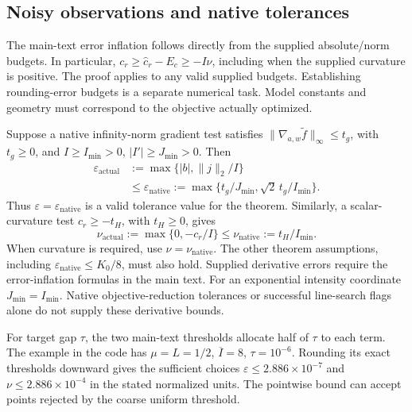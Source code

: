 \documentclass[10pt,a4paper]{article}
\begin{document}
\subsection{Noisy observations and native tolerances}
The main-text error inflation follows directly from the supplied absolute/norm budgets. In particular, $c_r\ge\widehat c_r-E_c\ge-I\nu$, including when the supplied curvature is positive. The proof applies to any valid supplied budgets. Establishing rounding-error budgets is a separate numerical task. Model constants and geometry must correspond to the objective actually optimized.

Suppose a native infinity-norm gradient test satisfies $\|\nabla_{a,w}\widetilde f\|_\infty\le t_g$, with $t_g\ge0$, and $I\ge I_{\min}>0$, $|I'|\ge J_{\min}>0$. Then
\begin{equation}
 \begin{aligned}
 \varepsilon_{\mathrm{actual}}&:=\max\{|b|,\|j\|_2/I\}\\
 &\le\varepsilon_{\mathrm{native}}
 :=\max\{t_g/J_{\min},\sqrt2\,t_g/I_{\min}\}.
 \end{aligned}
 \label{eq:sstoprawconversion}
\end{equation}
Thus $\varepsilon=\varepsilon_{\mathrm{native}}$ is a valid tolerance value for the theorem. Similarly, a scalar-curvature test $c_r\ge-t_H$, with $t_H\ge0$, gives
\begin{equation*}
 \nu_{\mathrm{actual}}:=\max\{0,-c_r/I\}
 \le\nu_{\mathrm{native}}:=t_H/I_{\min}.
\end{equation*}
When curvature is required, use $\nu=\nu_{\mathrm{native}}$. The other theorem assumptions, including $\varepsilon_{\mathrm{native}}\le K_0/8$, must also hold. Supplied derivative errors require the error-inflation formulas in the main text. For an exponential intensity coordinate $J_{\min}=I_{\min}$. Native objective-reduction tolerances or successful line-search flags alone do not supply these derivative bounds.

For target gap $\tau$, the two main-text thresholds allocate half of $\tau$ to each term. The example in the code has $\mu=L=1/2$, $\overline I=8$, $\tau=10^{-6}$. Rounding its exact thresholds downward gives the sufficient choices $\varepsilon\le2.886\times10^{-7}$ and $\nu\le2.886\times10^{-4}$ in the stated normalized units. The pointwise bound can accept points rejected by the coarse uniform threshold.
\end{document}
